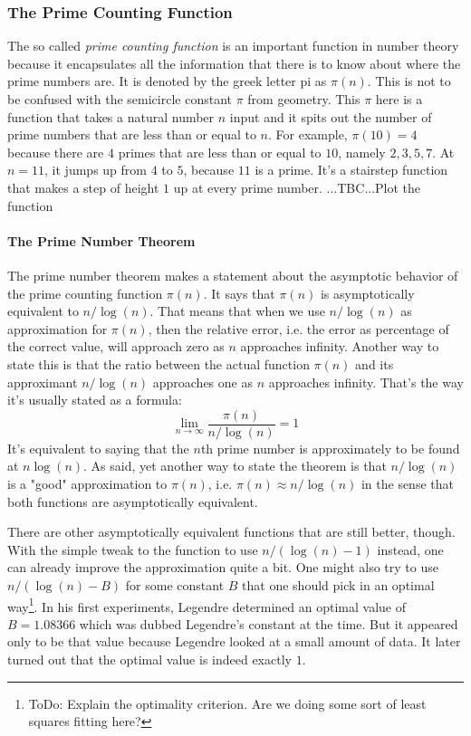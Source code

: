 
\subsubsection{The Prime Counting Function}
The so called \emph{prime counting function} is an important function in number theory because it encapsulates all the information that there is to know about where the prime numbers are. It is denoted by the greek letter pi as $\pi(n)$. This is not to be confused with the semicircle constant $\pi$ from geometry. This $\pi$ here is a function that takes a natural number $n$ input and it spits out the number of prime numbers that are less than or equal to $n$. For example, $\pi(10) = 4$ because there are $4$ primes that are less than or equal to $10$, namely $2,3,5,7$. At $n = 11$, it jumps up from $4$ to $5$, because $11$ is a prime. It's a stairstep function that makes a step of height $1$ up at every prime number. ...TBC...Plot the function


\paragraph{The Prime Number Theorem}
The prime number theorem makes a statement about the asymptotic behavior of the prime counting function $\pi(n)$. It says that $\pi(n)$ is asymptotically equivalent to $n / \log(n)$. That means that when we use $n / \log(n)$ as approximation for $\pi(n)$, then the relative error, i.e. the error as percentage of the correct value, will approach zero as $n$ approaches infinity. Another way to state this is that the ratio between the actual function $\pi(n)$ and its approximant $n / \log(n)$ approaches one as $n$ approaches infinity. That's the way it's usually stated as a formula:
\begin{equation}
 \lim_{n \rightarrow \infty}  \frac{\pi(n)}{n / \log(n) }  = 1
\end{equation}
It's equivalent to saying that the $n$th prime number is approximately to be found at $n \log(n)$. As said, yet another way to state the theorem is that $n / \log(n)$ is a "good" approximation to $\pi(n)$, i.e. $\pi(n) \approx n / \log(n)$ in the sense that both functions are asymptotically equivalent. 

\medskip
There are other asymptotically equivalent functions that are still better, though. With the simple tweak to the function to use $n / (\log(n) - 1)$ instead, one can already improve the approximation quite a bit. One might also try to use $n / (\log(n) - B)$ for some constant $B$ that one should pick in an optimal way\footnote{ToDo: Explain the optimality criterion. Are we doing some sort of least squares fitting here?}. In his first experiments, Legendre determined an optimal value of $B = 1.08366$ which was dubbed Legendre's constant at the time. But it appeared only to be that value because Legendre looked at a small amount of data. It later turned out that the optimal value is indeed exactly $1$.

